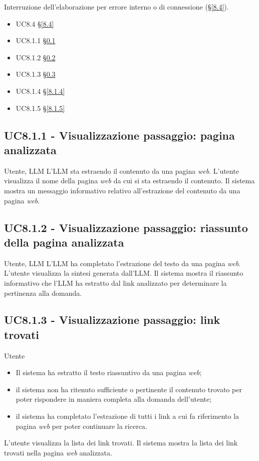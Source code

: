 {Interruzione dell'elaborazione per errore interno o di connessione (§\ref{8.4}).}
{
    \begin{itemize}
        \item UC8.4 §\ref{8.4}
    \end{itemize}
}
{
    \begin{itemize}
        \item UC8.1.1 §\ref{8.1.1}
        \item UC8.1.2 §\ref{8.1.2}
        \item UC8.1.3 §\ref{8.1.3}
        \item UC8.1.4 §\ref{8.1.4}
        \item UC8.1.5 §\ref{8.1.5}
    \end{itemize}
}

\subsection{UC8.1.1 - Visualizzazione passaggio: pagina analizzata}
\label{8.1.1}
\makeUC{}
{Utente, LLM}
{L'LLM sta estraendo il contenuto da una pagina \textit{web}.}
{L'utente visualizza il nome della pagina \textit{web} da cui si sta estraendo il contenuto.}
{Il sistema mostra un messaggio informativo relativo all'estrazione del contenuto da una pagina \textit{web}.}{}{}{}{}

\subsection{UC8.1.2 - Visualizzazione passaggio: riassunto della pagina analizzata}
\label{8.1.2}
\makeUC{}
{Utente, LLM}
{L'LLM ha completato l'estrazione del testo da una pagina \textit{web}.}
{L'utente visualizza la sintesi generata dall'LLM.}
{Il sistema mostra il riassunto informativo che l'LLM ha estratto dal link analizzato per determinare la pertinenza alla domanda.}{}{}{}{}

\subsection{UC8.1.3 - Visualizzazione passaggio: link trovati}
\label{8.1.3}
\makeUC{}
{Utente}
{
    \begin{itemize}
        \item Il sistema ha estratto il testo riassuntivo da una pagina \textit{web};
        \item il sistema non ha ritenuto sufficiente o pertinente il contenuto trovato per poter rispondere in maniera completa alla domanda dell'utente;
        \item il sistema ha completato l'estrazione di tutti i link a cui fa riferimento la pagina \textit{web} per poter continuare la ricerca.
    \end{itemize}
}
{L'utente visualizza la lista dei link trovati.}
{Il sistema mostra la lista dei link trovati nella pagina \textit{web} analizzata.}{}{}{}{}

